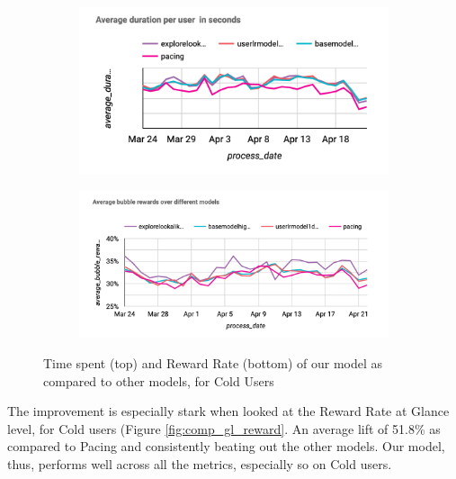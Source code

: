 \begin{figure}
    \centering
    \begin{subfigure}
      \centering
      \includegraphics[width=\linewidth]{figures/DurationCold-wrt3.png}
    \end{subfigure}%
    \begin{subfigure}
      \centering
      \includegraphics[width=\linewidth]{figures/BubRewardCold-wrt3.png}
    \end{subfigure}
    \caption{Time spent (top) and Reward Rate (bottom) of our model as compared to other models, for Cold Users}
    \label{fig:comp_3_cold}
\end{figure}


The improvement is especially stark when looked at the Reward Rate at Glance level, for Cold users (Figure \ref{fig:comp_gl_reward}. An average lift of 51.8\% as compared to Pacing and consistently beating out the other models. Our model, thus, performs well across all the metrics, especially so on Cold users.


